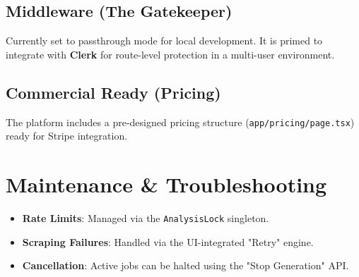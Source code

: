 \documentclass[11pt,a4paper]{article}
\begin{document}
\subsection{Middleware (The Gatekeeper)}
Currently set to passthrough mode for local development. It is primed to integrate with \textbf{Clerk} for route-level protection in a multi-user environment.

\subsection{Commercial Ready (Pricing)}
The platform includes a pre-designed pricing structure (\texttt{app/pricing/page.tsx}) ready for Stripe integration.

\section{Maintenance \& Troubleshooting}
\begin{itemize}
    \item \textbf{Rate Limits}: Managed via the \texttt{AnalysisLock} singleton.
    \item \textbf{Scraping Failures}: Handled via the UI-integrated "Retry" engine.
    \item \textbf{Cancellation}: Active jobs can be halted using the "Stop Generation" API.
\end{itemize}
\end{document}
